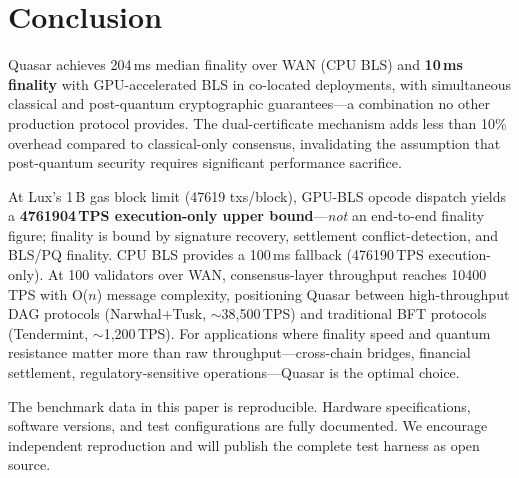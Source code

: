 \section{Conclusion}

\label{sec:conclusion}

Quasar achieves 204\,ms median finality over WAN (CPU BLS) and \textbf{10\,ms finality}
with GPU-accelerated BLS in co-located deployments, with simultaneous classical and
post-quantum cryptographic guarantees---a combination no other production protocol
provides. The dual-certificate mechanism adds less than 10\% overhead compared to
classical-only consensus, invalidating the assumption that post-quantum security
requires significant performance sacrifice.

At Lux's 1\,B gas block limit (\num{47619} txs/block), GPU-BLS opcode dispatch yields a
\textbf{\num{4761904}\,TPS execution-only upper bound}---\emph{not} an end-to-end finality
figure; finality is bound by signature recovery, settlement conflict-detection, and BLS/PQ
finality. CPU BLS provides a 100\,ms fallback (\num{476190}\,TPS execution-only). At 100 validators over WAN, consensus-layer throughput reaches
\num{10400}\,TPS with O($n$) message complexity, positioning Quasar between
high-throughput DAG protocols (Narwhal+Tusk, $\sim$38{,}500\,TPS) and traditional
BFT protocols (Tendermint, $\sim$1{,}200\,TPS). For applications where finality
speed and quantum resistance matter more than raw throughput---cross-chain bridges,
financial settlement, regulatory-sensitive operations---Quasar is the optimal choice.

The benchmark data in this paper is reproducible. Hardware specifications, software
versions, and test configurations are fully documented. We encourage independent
reproduction and will publish the complete test harness as open source.


